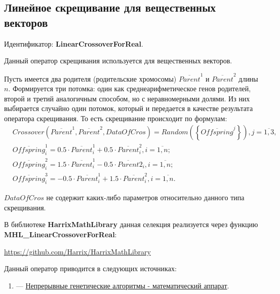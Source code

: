 \subsection{Линейное скрещивание для вещественных векторов}\label{SetOfOperatorsAlgorithms:LinearCrossoverForReal}

Идентификатор: \textbf{LinearCrossoverForReal}.

Данный оператор скрещивания используется для вещественных векторов.

Пусть имеется два родителя (родительские хромосомы) $ \overline{Parent}^1 $ и $ \overline{Parent}^2$ длины $n$. Формируется три потомка: один как среднеарифметическое генов родителей, второй и третий аналогичным способом, но с неравномерными долями.  Из них выбирается случайно один потомок, который и передается в качестве результата оператора скрещивания. То есть скрещивание происходит по формулам:
\begin{align}
\label{SetOfOperatorsAlgorithms:eq:LinearCrossoverForReal}
&Crossover \left( \overline{Parent}^1, \overline{Parent}^2, DataOfCros\right)=Random \left(\left\lbrace \overline{Offspring}^j\right\rbrace  \right), j=\overline{1,3}, \\
& \overline{Offspring}^1_i=0.5\cdot\overline{Parent}^1_i+0.5\cdot\overline{Parent}^2_i , i=\overline{1,n};\nonumber\\
&\overline{Offspring}^2_i=1.5\cdot\overline{Parent}^1_i-0.5\cdot\overline{Parent}2_i , i=\overline{1,n};\nonumber\\
&\overline{Offspring}^3_i=-0.5\cdot\overline{Parent}^1_i+1.5\cdot\overline{Parent}^2_i , i=\overline{1,n}.\nonumber
\end{align}

$ DataOfCros $ не содержит каких-либо параметров относительно данного типа скрещивания.

В библиотеке \textbf{HarrixMathLibrary} данная селекция реализуется через функцию \textbf{MHL\_LinearCrossoverForReal}:

\href{https://github.com/Harrix/HarrixMathLibrary}{https://github.com/Harrix/HarrixMathLibrary}

Данный оператор приводится в следующих источниках:

\begin{enumerate}
\item \cite{web:basegroup.ru:real_coded_ga} ---  \href{http://www.basegroup.ru/library/optimization/real_coded_ga/}{Непрерывные генетические алгоритмы - математический аппарат}.
\end{enumerate}